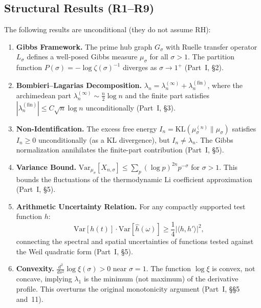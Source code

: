 \documentclass[12pt,a4paper]{article}
\theoremstyle{definition}
\theoremstyle{remark}
\newcommand{\muG}{\mu_\sigma}
\begin{document}
\subsection{Structural Results (R1--R9)}

The following results are unconditional (they do not assume RH):

\begin{enumerate}[label=\textbf{R\arabic*},leftmargin=3em]
  \item \textbf{Gibbs Framework.} The prime hub graph $G_\sigma$ with Ruelle transfer operator $L_\sigma$ defines a well-posed Gibbs measure $\muG$ for all $\sigma > 1$. The partition function $P(\sigma) = -\log\zeta(\sigma)^{-1}$ diverges as $\sigma \to 1^+$ (Part~I, \S2).

  \item \textbf{Bombieri--Lagarias Decomposition.} $\lambda_n = \lambda_n^{(\infty)} + \lambda_n^{(\mathrm{fin})}$, where the archimedean part $\lambda_n^{(\infty)} \sim \frac{n}{2}\log n$ and the finite part satisfies $|\lambda_n^{(\mathrm{fin})}| \leq C\sqrt{n}\log n$ unconditionally (Part~I, \S3).

  \item \textbf{Non-Identification.} The excess free energy $I_n = \mathrm{KL}(\mu_\sigma^{(n)} \| \muG)$ satisfies $I_n \geq 0$ unconditionally (as a KL divergence), but $I_n \neq \lambda_n$. The Gibbs normalization annihilates the finite-part contribution (Part~I, \S5).

  \item \textbf{Variance Bound.} $\mathrm{Var}_{\muG}[X_{n,\sigma}] \leq \sum_p (\log p)^{2n}p^{-\sigma}$ for $\sigma > 1$. This bounds the fluctuations of the thermodynamic Li coefficient approximation (Part~I, \S5).

  \item \textbf{Arithmetic Uncertainty Relation.} For any compactly supported test function $h$:
  \[ \mathrm{Var}[h(t)] \cdot \mathrm{Var}[\hat{h}(\omega)] \geq \frac{1}{4}\bigl|\langle h, h' \rangle\bigr|^2, \]
  connecting the spectral and spatial uncertainties of functions tested against the Weil quadratic form (Part~I, \S5).

  \item \textbf{Convexity.} $\frac{d^2}{ds^2}\log\xi(\sigma) > 0$ near $\sigma = 1$. The function $\log\xi$ is convex, not concave, implying $\lambda_1$ is the minimum (not maximum) of the derivative profile. This overturns the original monotonicity argument (Part~I, \S\S5 and~11).


\end{enumerate}
\end{document}
